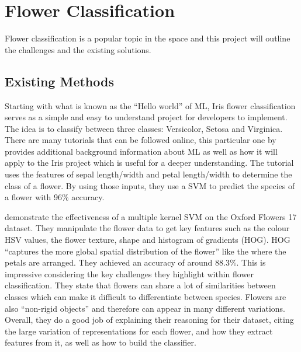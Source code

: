 \documentclass[12pt,a4paper]{report}
\begin{document}
\section{Flower Classification}

Flower classification is a popular topic in the space and this project will outline the challenges and the existing solutions.

\subsection{Existing Methods}

\label{subsec:existing}

Starting with what is known as the “Hello world” of ML, Iris flower classification serves as a simple and easy to 
understand project for developers to implement. The idea is to classify between three classes: Versicolor, Setosa and 
Virginica. There are many tutorials that can be followed online, this particular one by \citet{DataFlairND}
provides additional background information about ML as well as how it will apply to the Iris project which is useful for
a deeper understanding. The tutorial uses the features of sepal length/width and petal length/width to determine the class of
a flower. By using those inputs, they use a SVM to predict the species of a flower with 96\% accuracy.

\par

\citet{Nilsback2008} demonstrate the effectiveness of a multiple kernel SVM on the Oxford Flowers 17 dataset. 
They manipulate the flower data to get key features such as the colour HSV values, the flower texture, shape and 
histogram of gradients (HOG). HOG “captures the more global spatial distribution of the flower” like the where the 
petals are arranged. They achieved an accuracy of around 88.3\%. This is impressive considering the key challenges they 
highlight within flower classification. They state that flowers can share a lot of similarities between classes which 
can make it difficult to differentiate between species. Flowers are also “non-rigid objects” and therefore can appear in
many different variations. Overall, they do a good job of explaining their reasoning for their dataset, citing the 
large variation of representations for each flower, and how they extract features from it, as well as how to build the
classifier.

\par
\end{document}
